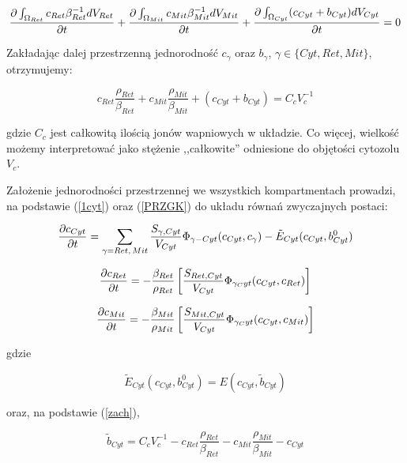 \[  
\frac{\partial \int_{\Omega_{Ret}}c_{Ret} \beta_{Ret}^{-1}dV_{Ret}}{\partial t} + 
\frac{\partial \int_{\Omega_{Mit}}c_{Mit} \beta_{Mit}^{-1}dV_{Mit}}{\partial t} + 
\frac{\partial \int_{\Omega_{Cyt}}(c_{Cyt}+b_{Cyt}) dV_{Cyt}}{\partial t} = 0
\] 

\noindent Zakładając dalej przestrzenną jednorodność $c_\gamma$ oraz $b_\gamma$, $\gamma \in \{Cyt,Ret,Mit\}$, otrzymujemy: 

\begin{equation} \label{zach}
c_{Ret} \dfrac{\rho_{Ret}}{\beta_{Ret}}+ 
c_{Mit} \dfrac{\rho_{Mit}}{\beta_{Mit}}+ 
(c_{Cyt}+b_{Cyt}) = C_c V_c^{-1}
\end{equation} 

\noindent gdzie $C_c$ jest całkowitą ilością jonów wapniowych w układzie. Co więcej, wielkość możemy interpretować jako stężenie ,,całkowite'' odniesione do objętości cytozolu $V_c$. 


\bigskip 

Założenie jednorodności przestrzennej we wszystkich kompartmentach prowadzi, na podstawie (\ref{1cyt}) oraz (\ref{PRZGK}) do układu równań zwyczajnych postaci: 

\begin{equation} \label{11cyt}   
\frac{\partial c_{Cyt}}{\partial t} = 
\sum_{\gamma = Ret, \,Mit} \frac{S_{\gamma,Cyt}}{V_{Cyt}} \Phi_{\gamma-Cyt}(c_{Cyt},c_\gamma)
- \tilde{E}_{Cyt} (c_{Cyt}, b^0_{Cyt}) 
\end{equation} 

\begin{equation} \label{PRZRet}
\frac{\partial c_{Ret}}{\partial t} = -\frac{\beta_{Ret}}{\rho_{Ret}} 
\left[\frac{S_{Ret,Cyt}}{V_{Cyt}} 
\Phi_{\gamma_Cyt} (c_{Cyt},c_{Ret}) \right] 
\end{equation} 

\begin{equation} \label{PRZMit}
\frac{\partial c_{Mit}}{\partial t} = -\frac{\beta_{Mit}}{\rho_{Mit}} 
\left[\frac{S_{Mit,Cyt}}{V_{Cyt}} 
\Phi_{\gamma_Cyt} (c_{Cyt},c_{Mit}) \right] 
\end{equation} 

\noindent gdzie 

\[ 
\tilde{E}_{Cyt} (c_{Cyt}, b^0_{Cyt}) = 
E(c_{Cyt},\tilde{b}_{Cyt}) \]

\noindent oraz, na podstawie (\ref{zach}), 

\[ 
\tilde{b}_{Cyt} = 
C_c V_c^{-1} - c_{Ret} \dfrac{\rho_{Ret}}{\beta_{Ret}} - 
c_{Mit} \dfrac{\rho_{Mit}}{\beta_{Mit}} -c_{Cyt}
\]

\bigskip 

